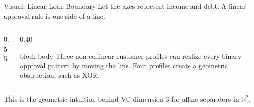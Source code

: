 \documentclass[aspectratio=169,10pt]{beamer}
\newcommand{\KeyBox}[1]{%
  \begin{beamercolorbox}[rounded=true,sep=0.22cm,wd=\linewidth]{block body}
    #1
  \end{beamercolorbox}%
}
\begin{document}
\begin{frame}[t]{Visual: Linear Loan Boundary}
  \vspace{0.04cm}\small
  Let the axes represent income and debt. A linear approval rule is one side of a line.
  \begin{columns}[T,totalwidth=\textwidth]
    \begin{column}{0.55\textwidth}
      \begin{center}
      \end{center}
    \end{column}
    \begin{column}{0.40\textwidth}
      \KeyBox{Three non-collinear customer profiles can realize every binary
      approval pattern by moving the line. Four profiles create a geometric
      obstruction, such as XOR.}
    \end{column}
  \end{columns}
  \vspace{0.04cm}
  \centering
  This is the geometric intuition behind VC dimension $3$ for affine separators in $\mathbb R^2$.
\end{frame}
\end{document}
